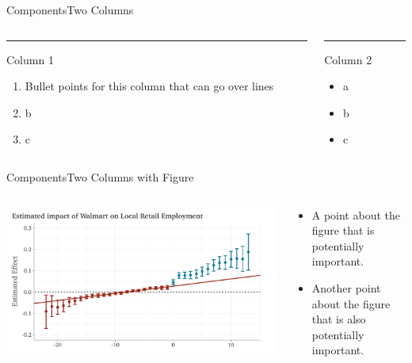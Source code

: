 \documentclass[aspectratio=169,t,11pt,table]{beamer}
\begin{document}
\begin{frame}{Components}{Two Columns}
  \begin{columns}[T]
    \begin{column}{.50\textwidth}
      \vspace{0pt}
      {\color{accent}\rule{\linewidth}{2pt}}
      Column 1

      \begin{enumerate}
        \item Bullet points for this column that can go over lines
        \item b
        \item c
      \end{enumerate}
    \end{column}
    
    \hfill
    
    \begin{column}{.50\textwidth}
      {\color{accent}\rule{\linewidth}{2pt}}
      Column 2

      \begin{itemize}
        \item a
        \item b
        \item c
      \end{itemize}
    \end{column}
  \end{columns}
\end{frame}

\begin{frame}{Components}{Two Columns with Figure}
  \begin{columns}[T]
    \begin{column}{.54\textwidth}
      \includegraphics[width=\textwidth]{figures/plot_did2s_retail_slides.pdf}
    \end{column}
    \hfill
    \begin{column}{.46\textwidth}
      \begin{itemize}
      \item A point about the figure that is potentially important.
      \item Another point about the figure that is also potentially important.
      \end{itemize}
    \end{column}
  \end{columns}
\end{frame}
\end{document}
